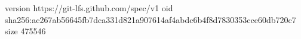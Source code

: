 version https://git-lfs.github.com/spec/v1
oid sha256:ac267ab56645fb7dca331d821a907614af4abdc6b4f8d7830353cce60db720c7
size 475546
